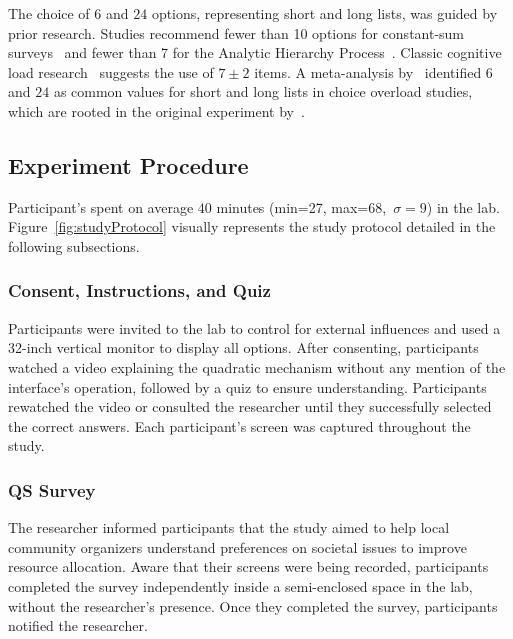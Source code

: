 The choice of $6$ and $24$ options, representing short and long lists, was guided by prior research. Studies recommend fewer than 10 options for constant-sum surveys~\cite{moroneyQuestionnaireDesignHow2019} and fewer than 7 for the Analytic Hierarchy Process~\cite{saatyPrinciplesAnalyticHierarchy1987}. Classic cognitive load research~\cite{millerMagicalNumberSeven1956, saaty2003magic} suggests the use of $7\pm2$ items. A meta-analysis by~\textcite{chernevChoiceOverloadConceptual2015} identified $6$ and $24$ as common values for short and long lists in choice overload studies, which are rooted in the original experiment by~\textcite{iyengarWhenChoiceDemotivating2000}.

\subsection{Experiment Procedure}
Participant's spent on average $40$ minutes (min=27, max=68,~$\sigma=9$) in the lab. Figure~\ref{fig:studyProtocol} visually represents the study protocol detailed in the following subsections. 

\subsubsection{Consent, Instructions, and Quiz}
Participants were invited to the lab to control for external influences and used a 32-inch vertical monitor to display all options. After consenting, participants watched a video explaining the quadratic mechanism without any mention of the interface's operation, followed by a quiz to ensure understanding. Participants rewatched the video or consulted the researcher until they successfully selected the correct answers. Each participant's screen was captured throughout the study.

\subsubsection{QS Survey}
The researcher informed participants that the study aimed to help local community organizers understand preferences on societal issues to improve resource allocation. Aware that their screens were being recorded, participants completed the survey independently inside a semi-enclosed space in the lab, without the researcher's presence. Once they completed the survey, participants notified the researcher.

